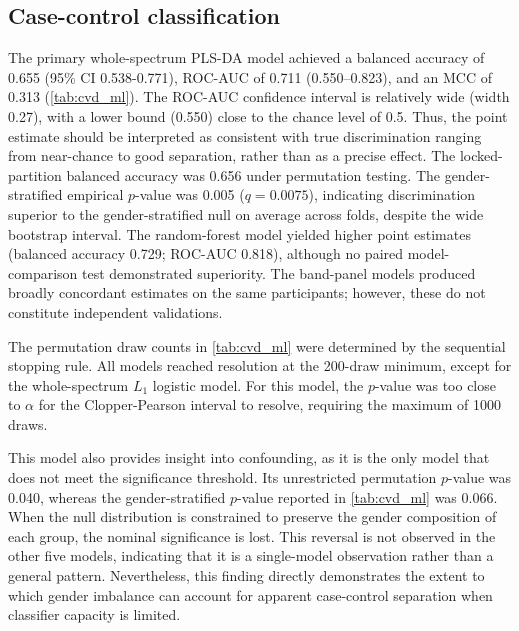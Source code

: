 \documentclass[preprint,12pt]{elsarticle}
\begin{document}
\subsection{Case-control classification} 
\label{subsec:cvd_ml}

The primary whole-spectrum PLS-DA model achieved a balanced accuracy of 0.655 (95\% CI 0.538-0.771), ROC-AUC of 0.711 (0.550–0.823), and an MCC of 0.313 (\cref{tab:cvd_ml}). The ROC-AUC confidence interval is relatively wide (width 0.27), with a lower bound (0.550) close to the chance level of 0.5. Thus, the point estimate should be interpreted as consistent with true discrimination ranging from near-chance to good separation, rather than as a precise effect. The locked-partition balanced accuracy was 0.656 under permutation testing. The gender-stratified empirical $p$-value was 0.005 ($q=0.0075$), indicating discrimination superior to the gender-stratified null on average across folds, despite the wide bootstrap interval. The random-forest model yielded higher point estimates (balanced accuracy 0.729; ROC-AUC 0.818), although no paired model-comparison test demonstrated superiority. The band-panel models produced broadly concordant estimates on the same participants; however, these do not constitute independent validations.

The permutation draw counts in \cref{tab:cvd_ml} were determined by the sequential stopping rule. All models reached resolution at the 200-draw minimum, except for the whole-spectrum $L_1$ logistic model. For this model, the $p$-value was too close to $\alpha$ for the Clopper-Pearson interval to resolve, requiring the maximum of 1000 draws.

This model also provides insight into confounding, as it is the only model that does not meet the significance threshold. Its unrestricted permutation $p$-value was 0.040, whereas the gender-stratified $p$-value reported in \cref{tab:cvd_ml} was 0.066. When the null distribution is constrained to preserve the gender composition of each group, the nominal significance is lost. This reversal is not observed in the other five models, indicating that it is a single-model observation rather than a general pattern. Nevertheless, this finding directly demonstrates the extent to which gender imbalance can account for apparent case-control separation when classifier capacity is limited.
\end{document}
